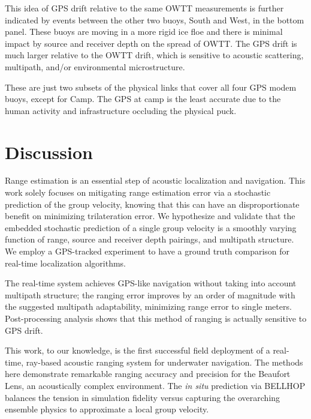 This idea of GPS drift relative to the same OWTT measurements is further indicated by events between the other two buoys, South and West, in the bottom panel.
These buoys are moving in a more rigid ice floe and there is minimal impact by source and receiver depth on the spread of OWTT.
The GPS drift is much larger relative to the OWTT drift, which is sensitive to acoustic scattering, multipath, and/or environmental microstructure.

These are just two subsets of the physical links that cover all four GPS modem buoys, except for Camp.
The GPS at camp is the least accurate due to the human activity and infrastructure occluding the physical puck.

\section{\label{sec:4} Discussion}

Range estimation is an essential step of acoustic localization and navigation.
This work solely focuses on mitigating range estimation error via a stochastic prediction of the group velocity, knowing that this can have an disproportionate benefit on minimizing trilateration error.
We hypothesize and validate that the embedded stochastic prediction of a single group velocity is a smoothly varying function of range, source and receiver depth pairings, and multipath structure.
We employ a GPS-tracked experiment to have a ground truth comparison for real-time localization algorithms.

The real-time system achieves GPS-like navigation without taking into account multipath structure; the ranging error improves by an order of magnitude with the suggested multipath adaptability, minimizing range error to single meters. 
Post-processing analysis shows that this method of ranging is actually sensitive to GPS drift.

This work, to our knowledge, is the first successful field deployment of a real-time, ray-based acoustic ranging system for underwater navigation.
The methods here demonstrate remarkable ranging accuracy and precision for the Beaufort Lens, an acoustically complex environment.
The \textit{in situ} prediction via BELLHOP balances the tension in simulation fidelity versus capturing the overarching ensemble physics to approximate a local group velocity.

